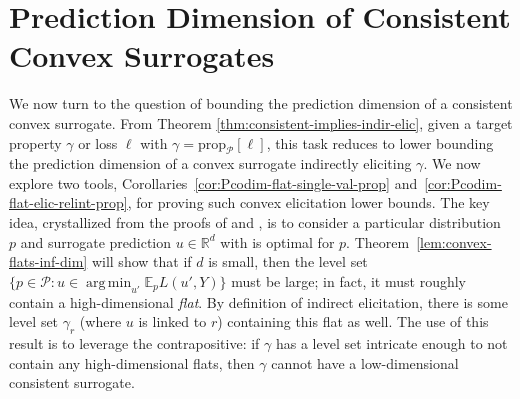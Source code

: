 \documentclass[anon,12pt]{colt2021} %
\newcommand{\Comments}{1}
\newcommand{\mynote}[2]{\ifnum\Comments=1\textcolor{#1}{#2}\fi}
\newcommand{\mytodo}[2]{\ifnum\Comments=1%
	\todo[linecolor=#1!80!black,backgroundcolor=#1,bordercolor=#1!80!black]{#2}\fi}
\newcommand{\jessie}[1]{\mynote{purple}{[JF: #1]}}
\newcommand{\jessiet}[1]{\mytodo{purple!20!white}{JF: #1}}
\newcommand{\reals}{\mathbb{R}}
\newcommand{\simplex}{\Delta_\Y}
\newcommand{\prop}[2][\mathcal{P}]{\mathrm{prop}_{#1}[#2]}
\newcommand{\spn}{\mathrm{span}}
\newcommand{\affhull}{\mathrm{affhull}}
\newcommand{\D}{\mathcal{D}}
\newcommand{\E}{\mathbb{E}}
\renewcommand{\P}{\mathcal{P}}
\newcommand{\X}{\mathcal{X}}
\newcommand{\Y}{\mathcal{Y}}
\newcommand{\exploss}[3]{\E_{#3} #1(#2,Y)}
\DeclareMathOperator*{\argmin}{arg\,min}
\begin{document}


\section{Prediction Dimension of Consistent Convex Surrogates}\label{sec:char-convex}
We now turn to the question of bounding the prediction dimension of a consistent convex surrogate.
From Theorem \ref{thm:consistent-implies-indir-elic}, given a target property $\gamma$ or loss $\ell$ with $\gamma = \prop{\ell}$, this task reduces to lower bounding the prediction dimension of a convex surrogate indirectly eliciting $\gamma$.
We now explore two tools, Corollaries~\ref{cor:Pcodim-flat-single-val-prop} and~\ref{cor:Pcodim-flat-elic-relint-prop}, for proving such convex elicitation lower bounds.
The key idea, crystallized from the proofs of \citet[Theorem 16]{ramaswamy2016convex} and \citet[Theorem~9]{agarwal2015consistent}, is to consider a particular distribution~$p$ and surrogate prediction $u \in \reals^d$ with is optimal for $p$.
Theorem~\ref{lem:convex-flats-inf-dim} will show that if $d$ is small, then the level set $\{p \in \P : u \in \argmin_{u'} \exploss{L}{u'}{p}\}$ must be large; in fact, it must roughly contain a high-dimensional \emph{flat}.
By definition of indirect elicitation, there is some level set $\gamma_r$ (where $u$ is linked to $r$) containing this flat as well.
The use of this result is to leverage the contrapositive: if $\gamma$ has a level set intricate enough to not contain any high-dimensional flats, then $\gamma$ cannot have a low-dimensional consistent surrogate.

\end{document}

